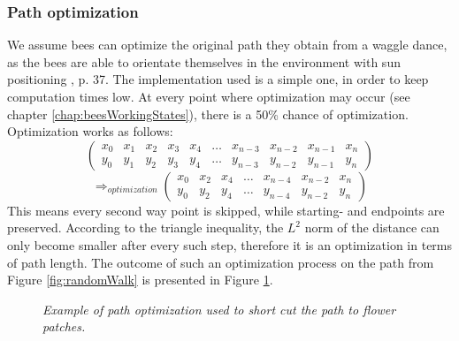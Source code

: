 	\subsubsection{Path optimization}
		\label{chap:pathOptimization}
		
		We assume bees can optimize the original path they obtain from a waggle dance, as the bees are able to orientate themselves in the environment with sun positioning \cite{seeley95}, p. 37. The implementation used is a simple one, in order to keep computation times low. At every point where optimization may occur (see chapter \ref{chap:beesWorkingStates}), there is a 50\% chance of optimization. Optimization works as follows:
		\[
			\begin{pmatrix}
				x_0 & x_1 & x_2 & x_3 & x_4 & \ldots & x_{n-3} & x_{n-2} & x_{n-1} & x_n \\
				y_0 & y_1 & y_2 & y_3 & y_4 & \ldots & y_{n-3} & y_{n-2} & y_{n-1} & y_n
			\end{pmatrix}
		\]
		\[
			\Longrightarrow_{optimization}
			\begin{pmatrix}
				x_0 & x_2 & x_4 & \ldots & x_{n-4} & x_{n-2} & x_{n} \\ y_0 & y_2 & y_4 & \ldots & y_{n-4} & y_{n-2} & y_{n}
			\end{pmatrix}
		\]
		This means every second way point is skipped, while starting- and endpoints are preserved. According to the triangle inequality, the $L^2$ norm of the distance can only become smaller after every such step, therefore it is an optimization in terms of path length. The outcome of such an optimization process on the path from Figure \ref{fig:randomWalk} is presented in Figure \ref{fig:pathOptimization}.\\
		
		\begin{figure}[H]
			\centering
			\caption{\textit{Example of path optimization used to short cut the path to flower patches.}}
			\label{fig:pathOptimization}
		\end{figure}
		

